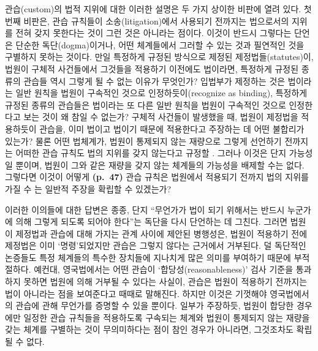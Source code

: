 관습(custom)의 법적 지위에 대한 이러한 설명은 두 가지 상이한 비판에 열려
있다. 첫 번째 비판은, 관습 규칙들이 소송(litigation)에서 사용되기
전까지는 법으로서의 지위를 전혀 갖지 못한다는 것이
 그런 것은 아니라는 점이다. 이것이 반드시
그렇다는 단언은 단순한 독단(dogma)이거나, 어떤 체계들에서 그러할 수 있는
것과 필연적인 것을 구별하지 못하는 것이다. 만일 특정하게 규정된 방식으로
제정된 제정법들(statutes)이, 법원이 구체적 사건들에서 그것들을 적용하기
이전에도 법이라면, 특정하게 규정된 종류의 관습들 역시 그렇게 될 수 없는
이유가 무엇인가? 입법부가 제정하는 것은 법이라는 일반 원칙을 법원이
구속적인 것으로 인정하듯이(recognize as binding), 특정하게 규정된 종류의
관습들은 법이라는 또 다른 일반 원칙을 법원이 구속적인 것으로 인정한다고
보는 것이 왜 참일 수 없는가? 구체적 사건들이 발생했을 때, 법원이
제정법을 적용하듯이 관습을, 이미 법이고 법이기 때문에 적용한다고
주장하는 데 어떤 불합리가 있는가? 물론 어떤 법체계가, 법원이 통제되지
않는 재량으로 그렇게 선언하기 전까지는 어떠한 관습 규칙도 법의 지위를
갖지 않는다고 규정할 . 그러나 이것은 단지
 가능성일 뿐이며, 법원이 그와 같은 재량을 갖지 않는
체계들의 가능성을 배제할 수는 없다. 그렇다면 이것이 어떻게
\textbf{(p.~47)} 관습 규칙은 법원에서 적용되기 전까지 법의 지위를 가질
수 는 일반적 주장을 확립할 수 있겠는가?

이러한 이의들에 대한 답변은 종종, 단지 “무언가가 법이 되기 위해서는
반드시 누군가에 의해 그렇게 되도록  되어야 한다”는
독단을 다시 단언하는 데 그친다. 그러면 법원이 제정법과 관습에 대해
가지는 관계 사이에 제안된 병행성은, 법원이 적용하기 전에 제정법은 이미
‘명령’되었지만 관습은 그렇지 않다는 근거에서 거부된다. 덜 독단적인
논증들도 특정 체계들의 특수한 장치들에 지나치게 많은 의미를 부여하기
때문에 부적절하다. 예컨대, 영국법에서는 어떤 관습이
‘합당성(reasonableness)’ 검사 기준을 통과하지 못하면 법원에 의해 거부될
수 있다는 사실이, 관습은 법원이 적용하기 전까지는 법이 아니라는 점을
보여준다고 때때로 말해진다. 하지만 이것은 기껏해야 영국법에서의 관습에
관해 무언가를 증명할 수 있을 뿐이다. 일부가 주장하듯, 법원이 합당한
경우에만 일정한 관습 규칙들을 적용하도록 구속되는 체계와 법원이 통제되지
않는 재량을 갖는 체계를 구별하는 것이 무의미하다는 점이 참인 경우가
아니라면, 그것조차도 확립될 수 없다.

